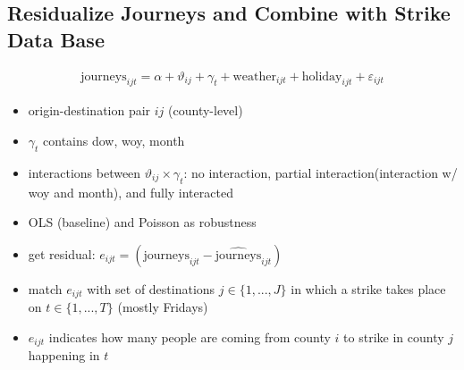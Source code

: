 \subsection{Residualize Journeys and Combine with Strike Data Base}
\begin{align}
	\text{journeys}_{ijt} = \alpha + \vartheta_{ij} + \gamma_t + \text{weather}_{ijt} + \text{holiday}_{ijt} + \varepsilon_{ijt} \label{eq_greta_cons:res_journeys}
\end{align}

\begin{itemize}
	\item origin-destination pair $ij$ (county-level)
	\item $\gamma_t$ contains dow, woy, month
	\item interactions between $\vartheta_{ij} \times \gamma_t$: no interaction, partial interaction(interaction w/ woy and month), and fully interacted
	\item OLS (baseline) and Poisson as robustness 
	\item get residual: $e_{ijt} =(\text{journeys}_{ijt} - \widehat{\text{journeys}}_{ijt})$
	\item match $e_{ijt}$ with set of destinations $j\in\{1,...,J\}$ in which a strike takes place on $t\in\{1,...,T\}$ (mostly Fridays)
	\item $e_{ijt}$ indicates how many people are coming from county $i$ to strike in county $j$ happening in $t$
\end{itemize}



